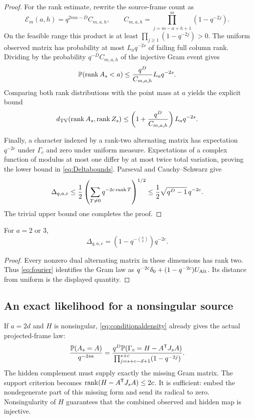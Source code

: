 \begin{proof}
For the rank estimate, rewrite the source-frame count as
\begin{equation}\label{eq:normalizedE}
 \mathcal E_m(a,h)=q^{2ma-D}C_{m,a,h},\qquad
 C_{m,a,h}=\prod_{j=m-a+h+1}^{m}(1-q^{-2j}).
\end{equation}
On the feasible range this product is at least
$\prod_{j\ge1}(1-q^{-2j})>0$.
The uniform observed matrix has probability at most $L_aq^{-2s}$
of failing full column rank. Dividing by the probability
$q^{-D}C_{m,a,h}$ of the injective Gram event gives
\[
 \mathbb P(\operatorname{rank} A_s<a)\le
 \frac{q^D}{C_{m,a,h}}L_aq^{-2s}.
\]
Comparing both rank distributions with the point mass at $a$ yields
the explicit bound
\begin{equation}\label{eq:rankexplicit}
 d_{\mathrm{TV}}(\operatorname{rank} A_s,\operatorname{rank} Z_s)
 \le\left(1+\frac{q^D}{C_{m,a,h}}\right)L_aq^{-2s}.
\end{equation}

Finally, a character indexed by a rank-two alternating matrix has
expectation $q^{-2c}$ under $\Gamma_c$ and zero under uniform measure.
Expectations of a complex function of modulus at most one differ by
at most twice total variation, proving the lower bound in
\eqref{eq:Deltabounds}. Parseval and Cauchy--Schwarz give
\[
 \Delta_{q,a,c}
 \le\frac12\left(\sum_{T\ne0}q^{-2c\operatorname{rank} T}\right)^{1/2}
 \le\frac12\sqrt{q^D-1}\,q^{-2c}.
\]
The trivial upper bound one completes the proof.
\end{proof}

\begin{corollary}\label{cor:small}
For $a=2$ or $3$,
\[
 \Delta_{q,a,c}=(1-q^{-\binom a2})q^{-2c}.
\]
\end{corollary}

\begin{proof}
Every nonzero dual alternating matrix in these dimensions has rank two.
Thus \eqref{eq:fourier} identifies the Gram law as
$q^{-2c}\delta_0+(1-q^{-2c})U_{\operatorname{Alt}}$. Its distance from uniform is
the displayed quantity.
\end{proof}

\subsection{An exact likelihood for a nonsingular source}

If $a=2d$ and $H$ is nonsingular, \eqref{eq:conditionaldensity}
already gives the actual projected-frame law:
\begin{equation}\label{eq:nondegdensity}
 \frac{\mathbb P(A_s=A)}{q^{-2sa}}=
 \frac{q^D\mathbb P(\Gamma_c=H-A^{\mathsf T}J_sA)}
      {\prod_{j=s+c-d+1}^{s+c}(1-q^{-2j})}.
\end{equation}
The hidden complement must supply exactly the missing Gram matrix.
The support criterion becomes
$\operatorname{rank}(H-A^{\mathsf T}J_sA)\le2c$.
It is sufficient: embed the nondegenerate part of this missing form
and send its radical to zero. Nonsingularity of $H$ guarantees that
the combined observed and hidden map is injective.

